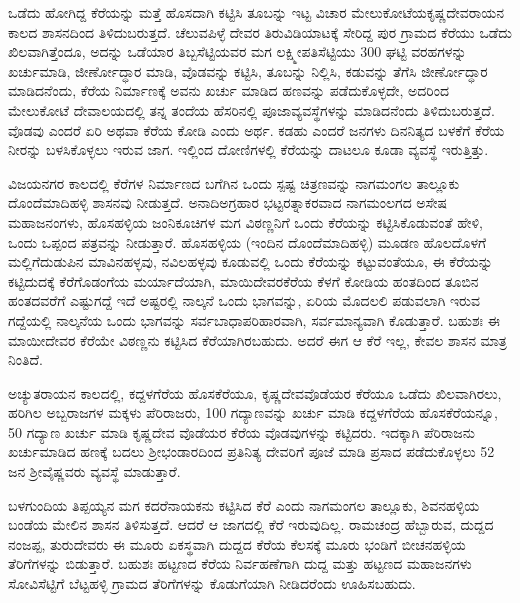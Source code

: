 ಒಡೆದು ಹೋಗಿದ್ದ ಕೆರೆಯನ್ನು ಮತ್ತೆ ಹೊಸದಾಗಿ ಕಟ್ಟಿಸಿ ತೂಬನ್ನು ಇಟ್ಟ ವಿಚಾರ ಮೇಲುಕೋಟೆಯ\break ಕೃಷ್ಣದೇವರಾಯನ ಕಾಲದ ಶಾಸನದಿಂದ ತಿಳಿದುಬರುತ್ತದೆ. ಚೆಲುವಪಿಳ್ಳೆ ದೇವರ ತಿರುವಿಡಿಯಾಟಕ್ಕೆ ಸೇರಿದ್ದ ಪುರ ಗ್ರಾಮದ ಕೆರೆಯು ಒಡೆದು ಖಿಲವಾಗಿತ್ತೆಂದೂ, ಅದನ್ನು ಒಡೆಯಾರ ತಿಬ್ಬಸೆಟ್ಟಿಯವರ ಮಗ ಲಕ್ಷ್ಮೀಪತಿಸೆಟ್ಟಿಯು 300 ಘಟ್ಟಿ ವರಹಗಳನ್ನು ಖರ್ಚುಮಾಡಿ, ಜೀರ್ಣೋದ್ಧಾರ ಮಾಡಿ, ವೊಡವನ್ನು ಕಟ್ಟಿಸಿ, ತೂಬನ್ನು ನಿಲ್ಲಿಸಿ, ಕಡುವನ್ನು ತೆಗೆಸಿ ಜೀರ್ಣೋದ್ಧಾರ ಮಾಡಿದನೆಂದು, ಕೆರೆಯ ನಿರ್ಮಾಣಕ್ಕೆ ಅವನು ಖರ್ಚು ಮಾಡಿದ ಹಣವನ್ನು ಪಡೆದುಕೊಳ್ಳದೇ, ಅದರಿಂದ ಮೇಲುಕೋಟೆ ದೇವಾಲಯದಲ್ಲಿ ತನ್ನ ತಂದೆಯ ಹೆಸರಿನಲ್ಲಿ ಪೂಜಾವ್ಯವಸ್ಥೆಗಳನ್ನು ಮಾಡಿದನೆಂದು ತಿಳಿದುಬರುತ್ತದೆ. ವೊಡವು ಎಂದರೆ ಏರಿ ಅಥವಾ ಕೆರೆಯ ಕೋಡಿ ಎಂದು ಅರ್ಥ. ಕಡಹು ಎಂದರೆ ಜನಗಳು ದಿನನಿತ್ಯದ ಬಳಕೆಗೆ ಕೆರೆಯ ನೀರನ್ನು ಬಳಸಿಕೊಳ್ಳಲು ಇರುವ ಜಾಗ. ಇಲ್ಲಿಂದ ದೋಣಿಗಳಲ್ಲಿ ಕೆರೆಯನ್ನು ದಾಟಲೂ ಕೂಡಾ ವ್ಯವಸ್ಥೆ ಇರುತ್ತಿತ್ತು.

ವಿಜಯನಗರ ಕಾಲದಲ್ಲಿ ಕೆರೆಗಳ ನಿರ್ಮಾಣದ ಬಗೆಗಿನ ಒಂದು ಸ್ಪಷ್ಟ ಚಿತ್ರಣವನ್ನು ನಾಗಮಂಗಲ ತಾಲ್ಲೂಕು ದೊಂದೆಮಾದಿಹಳ್ಳಿ ಶಾಸನವು ನೀಡುತ್ತದೆ. ಅನಾದಿಅಗ್ರಹಾರ ಭಟ್ಟರತ್ನಾಕರವಾದ ನಾಗಮಂಲಗದ ಅಸೇಷ ಮಹಾಜನಂಗಳು, ಹೊಸಹಳ್ಳಿಯ ಜಂನಿಕೂಚಿಗಳ ಮಗ ವಿಠಣ್ಣನಿಗೆ ಒಂದು ಕೆರೆಯನ್ನು ಕಟ್ಟಿಸಿಕೊಡುವಂತೆ ಹೇಳಿ, ಒಂದು ಒಪ್ಪಂದ ಪತ್ರವನ್ನು ನೀಡುತ್ತಾರೆ. ಹೊಸಹಳ್ಳಿಯ (ಇಂದಿನ ದೊಂದೆಮಾದಿಹಳ್ಳಿ) ಮೂಡಣ ಹೊಲದೊಳಗೆ ಮಲ್ಲಿಗೆದುಡುಪಿನ ಮಾವಿನಹಳ್ಳವು, ನವಿಲಹಳ್ಳವು ಕೂಡುವಲ್ಲಿ ಒಂದು ಕೆರೆಯನ್ನು ಕಟ್ಟುವಂತೆಯೂ, ಈ ಕೆರೆಯನ್ನು ಕಟ್ಟಿದುದಕ್ಕೆ ಕೆರೆಗೊಡಂಗೆಯ ಮರ್ಯಾದೆಯಾಗಿ, ಮಾಯಿದೇವರಕೆರೆಯ ಕೆಳಗೆ ಕೋಡಿಯ ಹಂತದಿಂದ ತೂಬಿನ ಹಂತದವರೆಗೆ ಎಷ್ಟುಗದ್ದೆ ಇದೆ ಅಷ್ಟರಲ್ಲಿ ನಾಲ್ಕನೆ ಒಂದು ಭಾಗವನ್ನು, ಏರಿಯ ಮೊದಲಲಿ ಪಡುವಲಾಗಿ ಇರುವ ಗದ್ದೆಯಲ್ಲಿ ನಾಲ್ಕನೆಯ ಒಂದು ಭಾಗವನ್ನು ಸರ್ವಬಾಧಾಪರಿಹಾರವಾಗಿ, ಸರ್ವಮಾನ್ಯವಾಗಿ ಕೊಡುತ್ತಾರೆ. ಬಹುಶಃ ಈ ಮಾಯೀದೇವರ ಕೆರೆಯೇ ವಿಠಣ್ಣನು ಕಟ್ಟಿಸಿದ ಕೆರೆಯಾಗಿರಬಹುದು. ಅದರೆ ಈಗ ಆ ಕೆರೆ ಇಲ್ಲ, ಕೇವಲ ಶಾಸನ ಮಾತ್ರ ನಿಂತಿದೆ.

ಅಚ್ಯುತರಾಯನ ಕಾಲದಲ್ಲಿ, ಕದ್ದಳಗೆರೆಯ ಹೊಸಕೆರೆಯೂ, ಕೃಷ್ಣದೇವವೊಡೆಯರ ಕೆರೆಯೂ ಒಡೆದು ಖಿಲವಾಗಿ\-ರಲು, ಹರಿಗಿಲ ಅಬ್ಬರಾಜಗಳ ಮಕ್ಕಳು ಪೆರಿರಾಜರು, 100 ಗದ್ಯಾಣವನ್ನು ಖರ್ಚು ಮಾಡಿ ಕದ್ದಳಗೆರೆಯ ಹೊಸಕೆರೆಯನ್ನೂ, 50 ಗದ್ಯಾಣ ಖರ್ಚು ಮಾಡಿ ಕೃಷ್ಣದೇವ ವೊಡೆಯರ ಕೆರೆಯ ವೊಡವುಗಳನ್ನು ಕಟ್ಟಿದರು. ಇದಕ್ಕಾಗಿ ಪೆರಿರಾಜನು ಖರ್ಚುಮಾಡಿದ ಹಣಕ್ಕೆ ಬದಲು ಶ‍್ರೀಭಂಡಾರದಿಂದ ಪ್ರತಿನಿತ್ಯ ದೇವರಿಗೆ ಪೂಜೆ ಮಾಡಿ ಪ್ರಸಾದ ಪಡೆದುಕೊಳ್ಳಲು 52 ಜನ ಶ‍್ರೀವೈಷ್ಣವರು ವ್ಯವಸ್ಥೆ ಮಾಡುತ್ತಾರೆ.

ಬಳಗುಂದಿಯ ತಿಪ್ಪಯ್ಯನ ಮಗ ಕದರೆನಾಯಕನು ಕಟ್ಟಿಸಿದ ಕೆರೆ ಎಂದು ನಾಗಮಂಗಲ ತಾಲ್ಲೂಕು, ಶಿವನಹಳ್ಳಿಯ ಬಂಡೆಯ ಮೇಲಿನ ಶಾಸನ ತಿಳಿಸುತ್ತದೆ. ಆದರೆ ಆ ಜಾಗದಲ್ಲಿ ಕೆರೆ ಇರುವುದಿಲ್ಲ. ರಾಮಚಂದ್ರ ಹೆಬ್ಬಾರುವ, ದುದ್ದದ ನಂಜಪ್ಪ, ತುರುದೇವರು ಈ ಮೂರು ಏಕಸ್ಥವಾಗಿ ದುದ್ದದ ಕೆರೆಯ ಕೆಲಸಕ್ಕೆ ಮೂರು ಭಂಡಿಗೆ ಬೀಚನಹಳ್ಳಿಯ ತೆರಿಗೆಗಳನ್ನು ಬಿಡುತ್ತಾರೆ. ಬಹುಶಃ ಹಟ್ಟಣದ ಕೆರೆಯ ನಿರ್ವಹಣೆಗಾಗಿ ದುದ್ದ ಮತ್ತು ಹಟ್ಟಣದ ಮಹಾಜನಗಳು ಸೋವಿಸೆಟ್ಟಿಗೆ ಬೆಟ್ಟಹಳ್ಳಿ ಗ್ರಾಮದ ತೆರಿಗೆಗಳನ್ನು ಕೊಡುಗೆಯಾಗಿ ನೀಡಿದರೆಂದು ಊಹಿಸಬಹುದು.

